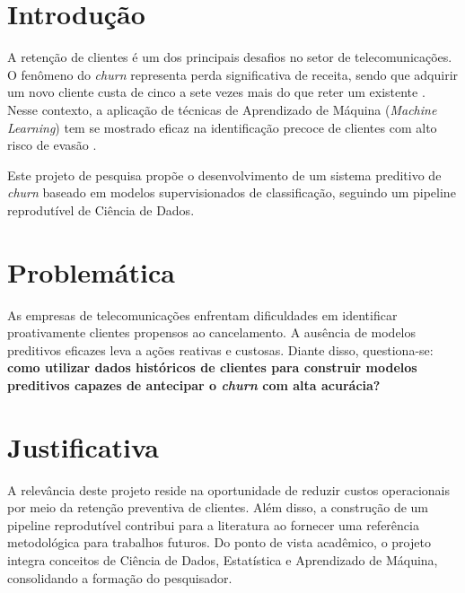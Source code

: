 \documentclass[
    article,
    12pt,
    oneside,
    a4paper,
    english,
    brazilian
    ]{abntex2}
\numberwithin{equation}{section}
\begin{document}
\pretextual
\maketitle
\newpage

\textual

\section{Introdução}

A retenção de clientes é um dos principais desafios no setor de telecomunicações. O fenômeno do \textit{churn} representa perda significativa de receita, sendo que adquirir um novo cliente custa de cinco a sete vezes mais do que reter um existente \cite{provost2013}. Nesse contexto, a aplicação de técnicas de Aprendizado de Máquina (\textit{Machine Learning}) tem se mostrado eficaz na identificação precoce de clientes com alto risco de evasão \cite{hastie2009}.

Este projeto de pesquisa propõe o desenvolvimento de um sistema preditivo de \textit{churn} baseado em modelos supervisionados de classificação, seguindo um pipeline reprodutível de Ciência de Dados.

\section{Problemática}

As empresas de telecomunicações enfrentam dificuldades em identificar proativamente clientes propensos ao cancelamento. A ausência de modelos preditivos eficazes leva a ações reativas e custosas. Diante disso, questiona-se: \textbf{como utilizar dados históricos de clientes para construir modelos preditivos capazes de antecipar o \textit{churn} com alta acurácia?}

\section{Justificativa}

A relevância deste projeto reside na oportunidade de reduzir custos operacionais por meio da retenção preventiva de clientes. Além disso, a construção de um pipeline reprodutível contribui para a literatura ao fornecer uma referência metodológica para trabalhos futuros. Do ponto de vista acadêmico, o projeto integra conceitos de Ciência de Dados, Estatística e Aprendizado de Máquina, consolidando a formação do pesquisador.
\end{document}
